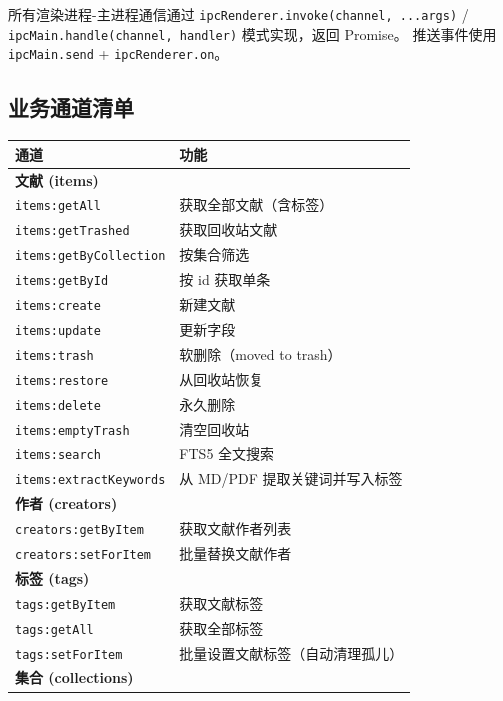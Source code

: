 \documentclass[12pt, a4paper]{article}
\begin{document}
所有渲染进程-主进程通信通过 \texttt{ipcRenderer.invoke(channel, ...args)} /
\texttt{ipcMain.handle(channel, handler)} 模式实现，返回 Promise。
推送事件使用 \texttt{ipcMain.send} + \texttt{ipcRenderer.on}。

\subsection{业务通道清单}

\begin{longtable}{p{4.8cm} p{7.8cm}}
  \toprule
  \textbf{通道} & \textbf{功能} \\
  \midrule
  \multicolumn{2}{l}{\textbf{文献 (items)}} \\
  \texttt{items:getAll}          & 获取全部文献（含标签） \\
  \texttt{items:getTrashed}      & 获取回收站文献 \\
  \texttt{items:getByCollection} & 按集合筛选 \\
  \texttt{items:getById}         & 按 id 获取单条 \\
  \texttt{items:create}          & 新建文献 \\
  \texttt{items:update}          & 更新字段 \\
  \texttt{items:trash}           & 软删除（moved to trash） \\
  \texttt{items:restore}         & 从回收站恢复 \\
  \texttt{items:delete}          & 永久删除 \\
  \texttt{items:emptyTrash}      & 清空回收站 \\
  \texttt{items:search}          & FTS5 全文搜索 \\
  \texttt{items:extractKeywords} & 从 MD/PDF 提取关键词并写入标签 \\
  \midrule
  \multicolumn{2}{l}{\textbf{作者 (creators)}} \\
  \texttt{creators:getByItem}    & 获取文献作者列表 \\
  \texttt{creators:setForItem}   & 批量替换文献作者 \\
  \midrule
  \multicolumn{2}{l}{\textbf{标签 (tags)}} \\
  \texttt{tags:getByItem}        & 获取文献标签 \\
  \texttt{tags:getAll}           & 获取全部标签 \\
  \texttt{tags:setForItem}       & 批量设置文献标签（自动清理孤儿） \\
  \midrule
  \multicolumn{2}{l}{\textbf{集合 (collections)}} \\

\end{longtable}
\end{document}
